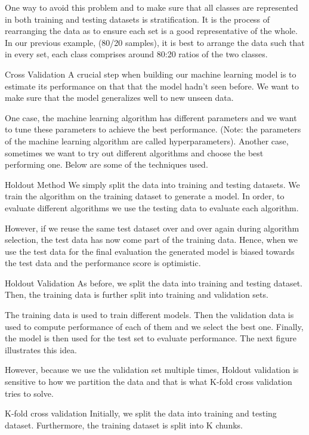 One way to avoid this problem and to make sure that all classes are represented in both training and testing datasets is stratification. It is the process of rearranging the data as to ensure each set is a good representative of the whole. In our previous example, (80/20 samples), it is best to arrange the data such that in every set, each class comprises around 80:20 ratios of the two classes.

Cross Validation
A crucial step when building our machine learning model is to estimate its performance on that that the model hadn't seen before. We want to make sure that the model generalizes well to new unseen data.

One case, the machine learning algorithm has different parameters and we want to tune these parameters to achieve the best performance. (Note: the parameters of the machine learning algorithm are called hyperparameters). Another case, sometimes we want to try out different algorithms and choose the best performing one. Below are some of the techniques used.

Holdout Method
We simply split the data into training and testing datasets. We train the algorithm on the training dataset to generate a model. In order, to evaluate different algorithms we use the testing data to evaluate each algorithm.

However, if we reuse the same test dataset over and over again during algorithm selection, the test data has now come part of the training data. Hence, when we use the test data for the final evaluation the generated model is biased towards the test data and the performance score is optimistic.

Holdout Validation
As before, we split the data into training and testing dataset. Then, the training data is further split into training and validation sets.

The training data is used to train different models. Then the validation data is used to compute performance of each of them and we select the best one. Finally, the model is then used for the test set to evaluate performance. The next figure illustrates this idea.


However, because we use the validation set multiple times, Holdout validation is sensitive to how we partition the data and that is what K-fold cross validation tries to solve.

K-fold cross validation
Initially, we split the data into training and testing dataset. Furthermore, the training dataset is split into K chunks.


